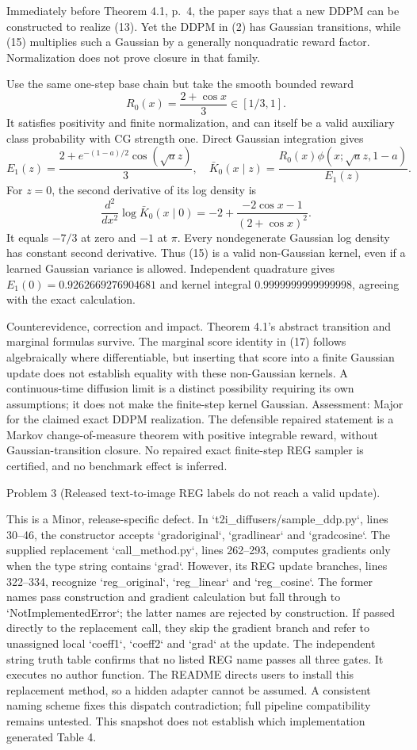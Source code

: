 \documentclass[10pt]{article}
\begin{document}
Immediately before Theorem 4.1, p. 4, the paper says that a new DDPM can be constructed to realize (13). Yet the DDPM in (2) has Gaussian transitions, while (15) multiplies such a Gaussian by a generally nonquadratic reward factor. Normalization does not prove closure in that family.\par
Use the same one-step base chain but take the smooth bounded reward \[R_0(x)=\frac{2+\cos x}{3}\in[1/3,1].\] It satisfies positivity and finite normalization, and can itself be a valid auxiliary class probability with CG strength one. Direct Gaussian integration gives \[E_1(z)=\frac{2+e^{-(1-a)/2}\cos(\sqrt a z)}3,
 \quad \bar K_0(x\mid z)=\frac{R_0(x)\phi(x;\sqrt a z,1-a)}{E_1(z)}.\] For \(z=0\), the second derivative of its log density is \[\frac{d^2}{dx^2}\log\bar K_0(x\mid0)
 =-2+\frac{-2\cos x-1}{(2+\cos x)^2}.\] It equals \(-7/3\) at zero and \(-1\) at \(\pi\). Every nondegenerate Gaussian log density has constant second derivative. Thus (15) is a valid non-Gaussian kernel, even if a learned Gaussian variance is allowed. Independent quadrature gives \(E_1(0)=0.9262669276904681\) and kernel integral \(0.9999999999999998\), agreeing with the exact calculation.\par
Counterevidence, correction and impact. Theorem 4.1’s abstract transition and marginal formulas survive. The marginal score identity in (17) follows algebraically where differentiable, but inserting that score into a finite Gaussian update does not establish equality with these non-Gaussian kernels. A continuous-time diffusion limit is a distinct possibility requiring its own assumptions; it does not make the finite-step kernel Gaussian. Assessment: Major for the claimed exact DDPM realization. The defensible repaired statement is a Markov change-of-measure theorem with positive integrable reward, without Gaussian-transition closure. No repaired exact finite-step REG sampler is certified, and no benchmark effect is inferred.\par
Problem 3 (Released text-to-image REG labels do not reach a valid update).\par
This is a Minor, release-specific defect. In `t2i\_diffusers/sample\_ddp.py`, lines 30–46, the constructor accepts `gradoriginal`, `gradlinear` and `gradcosine`. The supplied replacement `call\_method.py`, lines 262–293, computes gradients only when the type string contains `grad`. However, its REG update branches, lines 322–334, recognize `reg\_original`, `reg\_linear` and `reg\_cosine`. The former names pass construction and gradient calculation but fall through to `NotImplementedError`; the latter names are rejected by construction. If passed directly to the replacement call, they skip the gradient branch and refer to unassigned local `coeff1`, `coeff2` and `grad` at the update. The independent string truth table confirms that no listed REG name passes all three gates. It executes no author function. The README directs users to install this replacement method, so a hidden adapter cannot be assumed. A consistent naming scheme fixes this dispatch contradiction; full pipeline compatibility remains untested. This snapshot does not establish which implementation generated Table 4.\par
\end{document}
